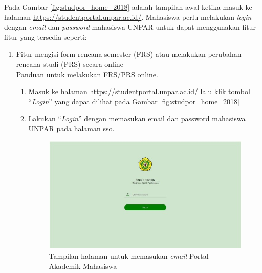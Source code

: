 Pada Gambar \ref{fig:studpor_home_2018} adalah tampilan awal ketika masuk ke halaman \url{https://studentportal.unpar.ac.id/}. Mahasiswa perlu melakukan \textit{login} dengan \textit{email} dan \textit{password} mahasiswa UNPAR untuk dapat menggunakan fitur-fitur yang tersedia seperti:
\begin{enumerate}
	\item Fitur mengisi form rencana semester (FRS) atau melakukan perubahan rencana studi (PRS) secara online \\
	Panduan untuk melakukan FRS/PRS online.
	\begin{enumerate}
		\item Masuk ke halaman \url{https://studentportal.unpar.ac.id/} lalu klik tombol ``\textit{Login}'' yang dapat dilihat pada Gambar \ref{fig:studpor_home_2018}
		\item Lakukan ``\textit{Login}'' dengan memasukan email dan password mahasiswa UNPAR pada halaman sso.
		\begin{figure}[H]
			\centering
			\includegraphics[scale=0.7]{Gambar/sso2018.jpg}
			\caption{Tampilan halaman untuk memasukan \textit{email} Portal Akademik Mahasiswa} 
			\label{fig:sso_2018}
		\end{figure}
	

\end{enumerate}
\end{enumerate}
